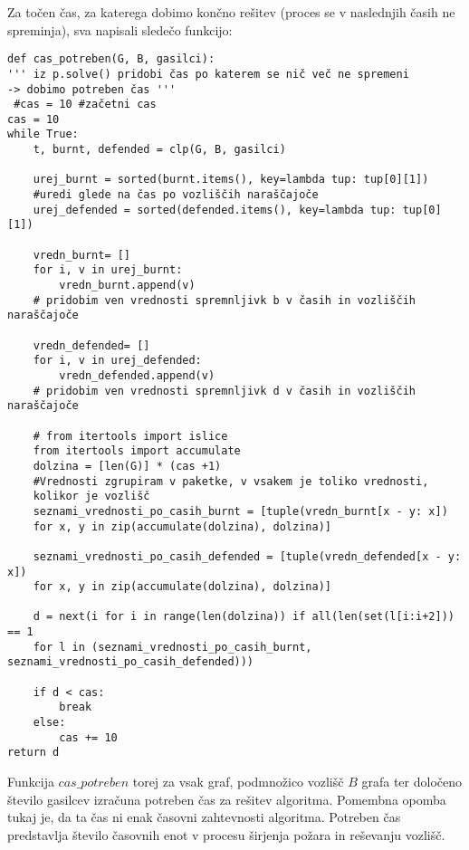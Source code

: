 \documentclass[a4paper, 12pt]{article}
\begin{document}
Za točen čas, za katerega dobimo končno rešitev (proces se v naslednjih časih ne spreminja),
sva napisali sledečo funkcijo:
\begin{verbatim}
def cas_potreben(G, B, gasilci):
''' iz p.solve() pridobi čas po katerem se nič več ne spremeni 
-> dobimo potreben čas '''
 #cas = 10 #začetni cas
cas = 10
while True:
    t, burnt, defended = clp(G, B, gasilci)

    urej_burnt = sorted(burnt.items(), key=lambda tup: tup[0][1])
    #uredi glede na čas po vozliščih naraščajoče
    urej_defended = sorted(defended.items(), key=lambda tup: tup[0][1]) 

    vredn_burnt= []
    for i, v in urej_burnt:
        vredn_burnt.append(v)
    # pridobim ven vrednosti spremnljivk b v časih in vozliščih naraščajoče

    vredn_defended= []
    for i, v in urej_defended:
        vredn_defended.append(v)
    # pridobim ven vrednosti spremnljivk d v časih in vozliščih naraščajoče

    # from itertools import islice
    from itertools import accumulate
    dolzina = [len(G)] * (cas +1) 
    #Vrednosti zgrupiram v paketke, v vsakem je toliko vrednosti, 
    kolikor je vozlišč
    seznami_vrednosti_po_casih_burnt = [tuple(vredn_burnt[x - y: x]) 
    for x, y in zip(accumulate(dolzina), dolzina)]

    seznami_vrednosti_po_casih_defended = [tuple(vredn_defended[x - y: x]) 
    for x, y in zip(accumulate(dolzina), dolzina)]

    d = next(i for i in range(len(dolzina)) if all(len(set(l[i:i+2])) == 1 
    for l in (seznami_vrednosti_po_casih_burnt, seznami_vrednosti_po_casih_defended)))
        
    if d < cas:
        break
    else:
        cas += 10
return d
\end{verbatim}
Funkcija $cas\_potreben$ torej za vsak graf, podmnožico vozlišč $B$ grafa ter določeno število gasilcev
izračuna potreben čas za rešitev algoritma. Pomembna opomba tukaj je, da ta čas ni enak časovni zahtevnosti
algoritma. Potreben čas predstavlja število časovnih enot v procesu širjenja požara in reševanju vozlišč.



% 
% 

\end{document}
